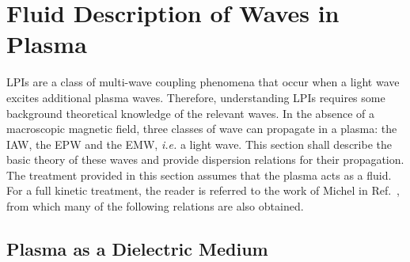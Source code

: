 \section{Fluid Description of Waves in Plasma}%
\label{sec:theory_waves_plasmas}

\ac{LPIs} are a class of multi-wave coupling phenomena that occur when a light wave excites additional plasma waves.
Therefore, understanding \ac{LPIs} requires some background theoretical knowledge of the relevant waves.
In the absence of a macroscopic magnetic field, three classes of wave can propagate in a plasma: the \ac{IAW}, the \ac{EPW} and the \ac{EMW}, \textit{i.e.} a light wave.
This section shall describe the basic theory of these waves and provide dispersion relations for their propagation.
The treatment provided in this section assumes that the plasma acts as a fluid.
For a full kinetic treatment, the reader is referred to the work of Michel in Ref.~\cite{michel_introduction_2023}, from which many of the following relations are also obtained.

\subsection{Plasma as a Dielectric Medium}%
\label{sec:theory_dielectric}

